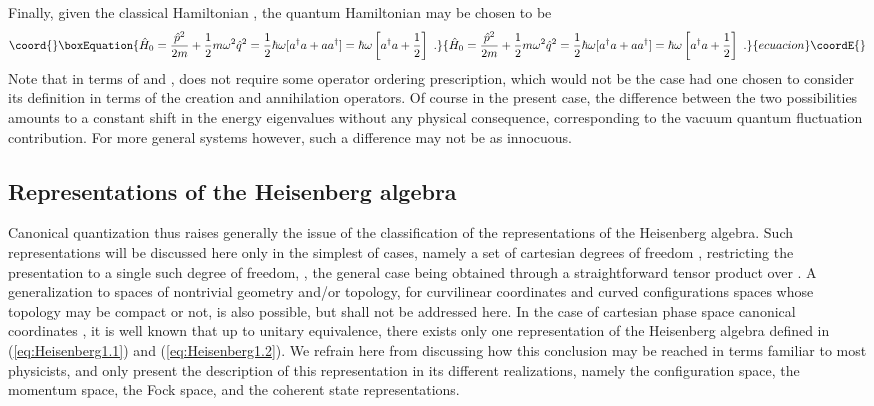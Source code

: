 \documentclass[a4paper,11pt]{article}
\begin{document}
Finally, given the classical Hamiltonian \coordHE{},
the quantum Hamiltonian may be chosen to be
\begin{equation}\coord{}\boxEquation{
\hat{H}_0=\frac{\hat{p}^2}{2m}+\frac{1}{2}m\omega^2\hat{q}^2=
\frac{1}{2}\hbar\omega[a^\dagger a+ a a^\dagger]=\hbar\omega
\left[a^\dagger a+\frac{1}{2}\right]\ .
}{
\hat{H}_0=\frac{\hat{p}^2}{2m}+\frac{1}{2}m\omega^2\hat{q}^2=
\frac{1}{2}\hbar\omega[a^\dagger a+ a a^\dagger]=\hbar\omega
\left[a^\dagger a+\frac{1}{2}\right]\ .
}{ecuacion}\coordE{}\end{equation}
Note that in terms of \coordHE{} and \coordHE{}, \coordHE{} does
not require some operator ordering prescription, which would not be
the case had one chosen to consider its definition in terms of
the creation and annihilation operators. Of course in the present
case, the difference between the two possibilities amounts to a
constant shift in the energy eigenvalues without any physical
consequence, corresponding to the vacuum quantum fluctuation
contribution. For more general systems however, such a difference may not
be as innocuous.

\subsection{Representations of the Heisenberg algebra}
\label{Subsect2.4}

Canonical quantization thus raises generally the issue of the classification
of the representations of the Heisenberg algebra. Such representations
will be discussed here only in the simplest of cases, namely a set
of cartesian degrees of freedom \coordHE{}, restricting the presentation
to a single such degree of freedom, \coordHE{}, the general case being obtained
through a straightforward tensor pro\-duct over \coordHE{}. 
A generalization to spaces of nontrivial geometry and/or topology,
for curvilinear coordinates and curved configurations spaces \coordHE{} whose 
topology may be compact or not, is also possible, but shall not be addressed 
here.\cite{JG2,JG2bis} In the case of cartesian phase space canonical 
coordinates \coordHE{},
it is well known that up to unitary equivalence, there exists only
one representation of the Heisenberg algebra defined in
(\ref{eq:Heisenberg1.1}) and (\ref{eq:Heisenberg1.2}). 
We refrain here from discussing how this conclusion may be reached
in terms familiar to most physicists,\cite{JG1,JG2,JG2bis} and only present 
the description of this representation in its different realizations,
namely the configuration space, the momentum space, the Fock space, 
and the coherent state representations.
\end{document}
